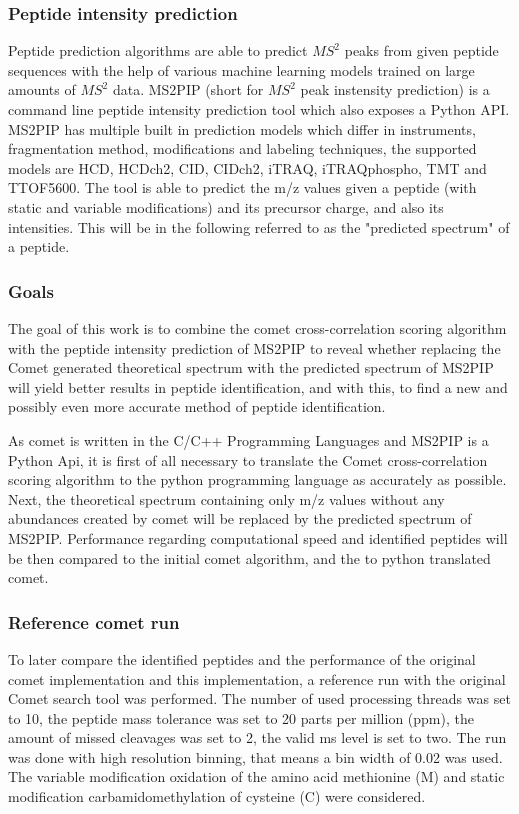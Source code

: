 \documentclass[11pt]{article}
\begin{document}
\subsubsection{Peptide intensity prediction}
Peptide prediction algorithms are able to predict \(MS^2\) peaks from given peptide sequences with the help of various machine learning models trained on large amounts of \(MS^2\) data. MS2PIP\cite{ms2pip} (short for \(MS^2\) peak instensity prediction) is a command line peptide intensity prediction tool which also exposes a Python API. MS2PIP has multiple built in prediction models which differ in instruments, fragmentation method, modifications and labeling techniques, the supported models are HCD, HCDch2, CID, CIDch2, iTRAQ, iTRAQphospho, TMT and TTOF5600. The tool is able to predict the m/z values given a peptide (with static and variable modifications) and its precursor charge, and also its intensities. This will be in the following referred to as the "predicted spectrum" of a peptide.

\subsubsection{Goals}
The goal of this work is to combine the comet cross-correlation scoring algorithm
with the peptide intensity prediction of MS2PIP to reveal whether replacing the Comet generated theoretical spectrum with the predicted spectrum of MS2PIP will yield better results in peptide identification, and with this, to find a new and possibly even more accurate method of peptide identification.

As comet is written in the C/C++ Programming Languages and MS2PIP is a Python Api, it is first of all necessary to translate the Comet cross-correlation scoring algorithm to the python programming language as accurately as possible. Next, the theoretical spectrum containing only m/z values without any abundances created by comet will be replaced by the predicted spectrum of MS2PIP. Performance regarding computational speed and identified peptides will be then compared to the initial comet algorithm, and the to python translated comet. 

\subsubsection{Reference comet run}
To later compare the identified peptides and the performance of the original comet implementation and this implementation, a reference run with the original Comet search tool was performed. The number of used processing threads was set to 10, the peptide mass tolerance was set to 20 parts per million (ppm), the amount of missed cleavages was set to 2, the valid ms level is set to two. The run was done with high resolution binning, that means a bin width of 0.02 was used. The variable modification oxidation of the amino acid methionine (M) and static modification carbamidomethylation of cysteine (C) were considered.
\end{document}
